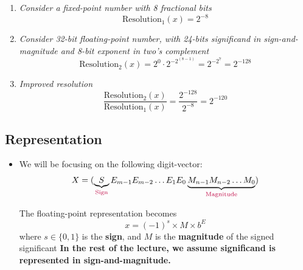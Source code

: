 \documentclass[12pt,openany]{book}
\begin{document}
			      	
			      	\begin{enumerate}
			      		
			      		\item \textit{Consider a fixed-point number with 8 fractional bits}
			      		      \begin{equation*}
			      		      	\text{Resolution}_1(x) = 2^{-8}
			      		      \end{equation*}
			      		          
			      		\item \textit{Consider 32-bit floating-point number, with 24-bits significand in sign-and-magnitude and 8-bit exponent in two's complement}
			      		      \begin{equation*}
			      		      	\text{Resolution}_2(x) = 2^0 \cdot 2^{-2^(8-1)} = 2^{-2^7} = 2^{-128}
			      		      \end{equation*}
			      		          
			      		\item \textit{Improved resolution}
			      		      \begin{equation*}
			      		      	\frac{\text{Resolution}_2(x)}{\text{Resolution}_1(x)} = \frac{2^{-128}}{2^{-8}} = 2^{-120}
			      		      \end{equation*}
			      	\end{enumerate}
			      	
			      	
			      	    
			      	\subsection{Representation}
			      	\begin{itemize}
			      		\item[] We will be focusing on the following digit-vector:
			      		      \[
			      		      	X = (\underbrace{S}_{\text{\color{purple}Sign}}E_{m-1}E_{m-2}\dots E_1E_0\underbrace{M_{n-1}M_{n-2}\dots M_0}_{\text{\color{purple}Magnitude}})
			      		      \]
			      		      
			      		      
			      		      The floating-point representation becomes
			      		      \[
			      		      	x = (-1)^s \times M \times b^E
			      		      \]
			      		      where \( s \in \{0, 1\} \) is the \textbf{sign}, and \( M \) is the \textbf{magnitude} of the signed significant
			      		      \vskip 0.5cm
			      		      \textbf{In the rest of the lecture, we assume significand is represented in sign-and-magnitude.}
			      	\end{itemize}
			      	
\end{document}
